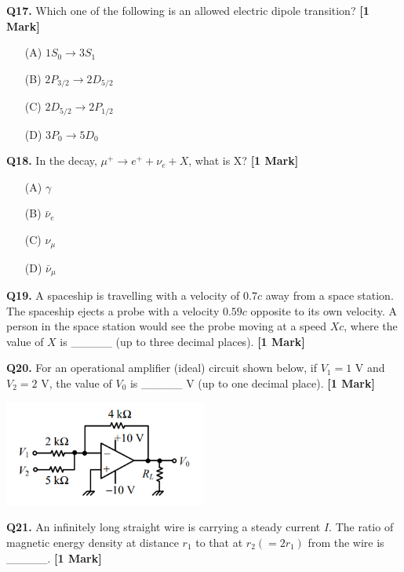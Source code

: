 \documentclass[11pt]{article}
\newcommand{\questiona}[2]{
    \noindent\textbf{Q#2.} #1 \hfill \textbf{[1 Mark]}
}
\begin{document}
\questiona{Which one of the following is an allowed electric dipole transition?}{17}
\begin{enumerate}
    \item[(A)] \(1S_0 \rightarrow 3S_1\)  
    \item[(B)] \(2P_{3/2} \rightarrow 2D_{5/2}\)  
    \item[(C)] \(2D_{5/2} \rightarrow 2P_{1/2}\)  
    \item[(D)] \(3P_0 \rightarrow 5D_0\)  
\end{enumerate}
\vspace{0.5cm}

\questiona{In the decay, \(\mu^+ \rightarrow e^+ + \nu_e + X\), what is X?}{18}
\begin{enumerate}
    \item[(A)] \(\gamma\)  
    \item[(B)] \(\bar{\nu}_e\)  
    \item[(C)] \(\nu_{\mu}\)  
    \item[(D)] \(\bar{\nu}_{\mu}\)  
\end{enumerate}
\vspace{0.5cm}

\questiona{A spaceship is travelling with a velocity of \(0.7c\) away from a space station. The spaceship ejects a probe with a velocity \(0.59c\) opposite to its own velocity. A person in the space station would see the probe moving at a speed \(Xc\), where the value of \(X\) is \_\_\_\_\_ (up to three decimal places).}{19}
\vspace{0.5cm}

\questiona{For an operational amplifier (ideal) circuit shown below, if \(V_1 = 1\text{ V}\) and \(V_2 = 2\text{ V}\), the value of \(V_0\) is \_\_\_\_\_ V (up to one decimal place).}{20}
\begin{center}
\includegraphics[width=0.5\textwidth]{figures/20.png}
\end{center}
\vspace{0.5cm}

\questiona{An infinitely long straight wire is carrying a steady current \(I\). The ratio of magnetic energy density at distance \(r_1\) to that at \(r_2 (= 2r_1)\) from the wire is \_\_\_\_\_.}{21}
\vspace{0.5cm}
\end{document}

